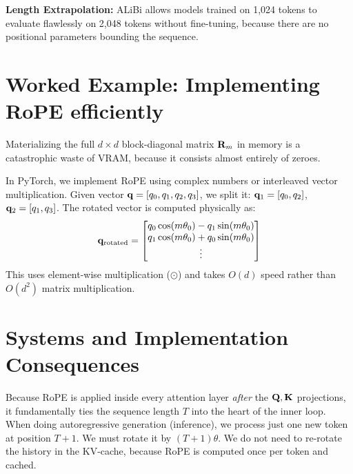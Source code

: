 \textbf{Length Extrapolation:} ALiBi allows models trained on 1,024 tokens to evaluate flawlessly on 2,048 tokens without fine-tuning, because there are no positional parameters bounding the sequence.

\section{Worked Example: Implementing RoPE efficiently}
\label{ch:11:sec:example}

Materializing the full $d \times d$ block-diagonal matrix $\mathbf{R}_m$ in memory is a catastrophic waste of VRAM, because it consists almost entirely of zeroes.

In PyTorch, we implement RoPE using complex numbers or interleaved vector multiplication. 
Given vector $\mathbf{q} = [q_0, q_1, q_2, q_3]$, we split it: $\mathbf{q}_1 = [q_0, q_2]$, $\mathbf{q}_2 = [q_1, q_3]$.
The rotated vector is computed physically as:
\begin{equation}
\mathbf{q}_{\text{rotated}} = \begin{bmatrix} q_0 \cos(m\theta_0) - q_1 \sin(m\theta_0) \\ q_1 \cos(m\theta_0) + q_0 \sin(m\theta_0) \\ \vdots \end{bmatrix}
\end{equation}
This uses element-wise multiplication ($\odot$) and takes $O(d)$ speed rather than $O(d^2)$ matrix multiplication.

\section{Systems and Implementation Consequences}
\label{ch:11:sec:systems}

Because RoPE is applied inside every attention layer \emph{after} the $\mathbf{Q}, \mathbf{K}$ projections, it fundamentally ties the sequence length $T$ into the heart of the inner loop. 
When doing autoregressive generation (inference), we process just one new token at position $T+1$. We must rotate it by $(T+1)\theta$. We do not need to re-rotate the history in the KV-cache, because RoPE is computed once per token and cached.


